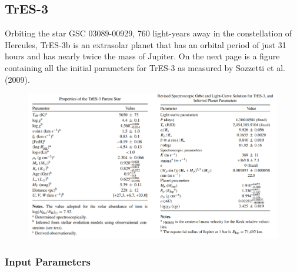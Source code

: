 \documentclass[11pt]{article}
\begin{document}
\hypertarget{tres-3}{%
\subsection{TrES-3}\label{tres-3}}

Orbiting the star GSC 03089-00929, 760 light-years away in the
constellation of Hercules, TrES-3b is an extrasolar planet that has an
orbital period of just 31 hours and has nearly twice the mass of
Jupiter. On the next page is a figure containing all the initial parameters for TrES-3 as measured by Sozzetti et al. (2009).

\begin{figure}
	\centering
	\includegraphics[width=1\linewidth]{../images/TrES-3_combined.png}
	\label{Tab_2}
\end{figure}

\medskip

\subsubsection*{Input Parameters}
\end{document}
